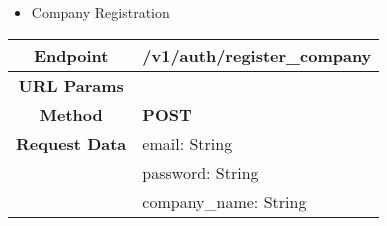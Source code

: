     \begin{itemize}
        \item Company Registration
    \end{itemize}
    \begin{adjustwidth}{1cm}{}
        \begin{longtable}{|c|l|}
            \hline
            \textbf{Endpoint} & /v1/auth/register\_company \\
            \hline
            \textbf{URL Params} &  \\
            \hline
            \textbf{Method} & \textbf{POST} \\
            \hline
            \textbf{Request Data} & email: String \\
            &                 password: String \\
            &                 company\_name: String \\


\end{longtable}
\end{adjustwidth}
